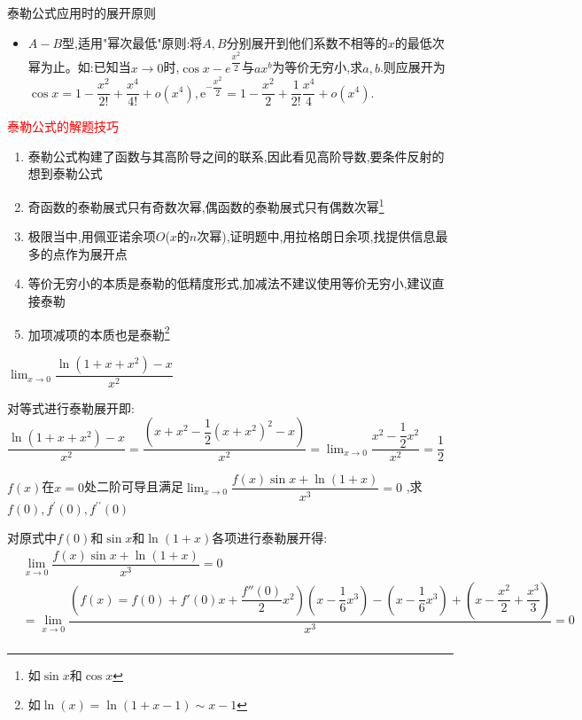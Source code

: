 \documentclass[12pt, a4paper, oneside, UTF8]{ctexbook}
\begin{document}
\begin{sloppypar}
\begin{criterion}{泰勒公式应用时的展开原则}{}
\begin{itemize}
            \item $A-B$型,适用"幂次最低"原则:将$A,B$分别展开到他们系数不相等的$x$的最低次幂为止。如:已知当$x\to0$时,$\cos x-e^{\dfrac{x^2}2}$与$ax^b$为等价无穷小,求$a,b$.则应展开为$\cos x=1-\dfrac{x^2}{2!}+\dfrac{x^4}{4!}+o(x^4),\mathrm{e}^{-\dfrac{x^2}{2}}=1-\dfrac{x^2}{2}+\dfrac{1}{2!}\dfrac{x^4}{4}+o(x^4).$
        \end{itemize}
    \end{criterion}
    \begin{criterion}{\textcolor{red}{泰勒公式的解题技巧}}{}
        \begin{enumerate}
            \item 泰勒公式构建了函数与其高阶导之间的联系,因此看见高阶导数,要条件反射的想到泰勒公式
            \item 奇函数的泰勒展式只有奇数次幂,偶函数的泰勒展式只有偶数次幂\footnote{如$\sin x$和$\cos x$}
            \item 极限当中,用佩亚诺余项$O$($x$的$n$次幂),证明题中,用拉格朗日余项,找提供信息最多的点作为展开点
            \item 等价无穷小的本质是泰勒的低精度形式,加减法不建议使用等价无穷小,建议直接泰勒
            \item 加项减项的本质也是泰勒\footnote{如$\ln(x)=\ln(1+x-1)\sim x-1$}
        \end{enumerate}
    \end{criterion}
    \begin{problem}
        $\lim_{x\to0}\dfrac{\ln\left(1+x+x^{2}\right)-x}{x^{2}}$
    \end{problem}
    \begin{solution}
        对等式进行泰勒展开即:\\$\dfrac{\ln(1+x+x^2)-x}{x^2}=\dfrac{(x+x^2-\dfrac{1}{2}(x+x^2)^2-x)}{x^2}=\lim_{x \to 0}\dfrac{x^2-\dfrac{1}{2}x^2}{x^2}=\dfrac{1}{2}$
    \end{solution}
    \begin{problem}
        $f(x)$在$x=0$处二阶可导且满足$\lim_{x\to 0}\dfrac{f(x)\sin x+\ln(1+x)}{x^3}=0$ ,求$f(0),f^{\prime}(0),f^{\prime\prime}(0)$
    \end{problem}
    \begin{solution}
        对原式中$f(0)$和$\sin x$和$\ln(1+x)$各项进行泰勒展开得:
    \begin{equation*}
        \begin{split}    
            & \lim_{x\to 0}\dfrac{f(x)\sin x+\ln(1+x)}{x^3}=0 \\
            & = \lim_{x \to 0}\dfrac{(f(x)=f(0)+f'(0)x+\dfrac{f''(0)}{2}x^2)(x-\dfrac{1}{6}x^3)-(x-\dfrac{1}{6}x^3)+(x-\dfrac{x^2}{2}+\dfrac{x^3}{3})}{x^3}=0 \\

\end{split}
\end{equation*}
\end{solution}
\end{sloppypar}
\end{document}
